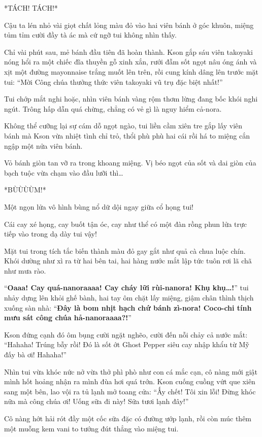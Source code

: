\documentclass[../main.tex]{subfiles}
\begin{document}
*TÁCH! TÁCH!*

Cậu ta lén nhỏ vài giọt chất lỏng màu đỏ vào hai viên bánh ở góc khuôn, miệng tủm tỉm cười đầy tà ác mà cứ ngỡ tui không nhìn thấy.

Chỉ vài phút sau, mẻ bánh đầu tiên đã hoàn thành. Kson gắp sáu viên takoyaki nóng hổi ra một chiếc đĩa thuyền gỗ xinh xắn, rưới đẫm sốt ngọt nâu óng ánh và xịt một đường mayonnaise trắng muốt lên trên, rồi cung kính dâng lên trước mặt tui: ``Mời Công chúa thưởng thức viên takoyaki vũ trụ đặc biệt nhất!''

Tui chớp mắt nghi hoặc, nhìn viên bánh vàng rộm thơm lừng đang bốc khói nghi ngút. Trông hấp dẫn quá chừng, chẳng có vẻ gì là nguy hiểm cả-nora.

Không thể cưỡng lại sự cám dỗ ngọt ngào, tui liền cầm xiên tre gắp lấy viên bánh mà Kson vừa nhiệt tình chỉ trỏ, thổi phù phù hai cái rồi há to miệng cắn ngập một nửa viên bánh.

Vỏ bánh giòn tan vỡ ra trong khoang miệng. Vị béo ngọt của sốt và dai giòn của bạch tuộc vừa chạm vào đầu lưỡi thì\dots

*BÙÙÙÙM!*

Một ngọn lửa vô hình bùng nổ dữ dội ngay giữa cổ họng tui!

Cái cay xé họng, cay buốt tận óc, cay như thể có một đàn rồng phun lửa trực tiếp vào trong dạ dày tui vậy!

Mặt tui trong tích tắc biến thành màu đỏ gay gắt như quả cà chua luộc chín. Khói dường như xì ra từ hai bên tai, hai hàng nước mắt lập tức tuôn rơi lã chã như mưa rào.

``\textbf{Oaaa! Cay quá-nanoraaaa! Cay cháy lữi rùi-nanora! Khụ khụ\dots!}'' tui nhảy dựng lên khỏi ghế bành, hai tay ôm chặt lấy miệng, giậm chân thình thịch xuống sàn nhà: ``\textbf{Đây là bom nhịt hạch chứ bánh zì-nora! Coco-chi tính mưu sát công chúa hả-nanoraaaa?!}''

Kson đứng cạnh đó ôm bụng cười ngặt nghẽo, cười đến nỗi chảy cả nước mắt: ``Hahaha! Trúng bẫy rồi! Đó là sốt ớt Ghost Pepper siêu cay nhập khẩu từ Mỹ đấy bà ơi! Hahaha!''

Nhìn tui vừa khóc nức nở vừa thở phì phò như con cá mắc cạn, cô nàng mới giật mình hốt hoảng nhận ra mình đùa hơi quá trớn. Kson cuống cuồng vứt que xiên sang một bên, lao vội ra tủ lạnh mở toang cửa: ``Ấy chết! Tôi xin lỗi! Đừng khóc nữa mà công chúa ơi! Uống sữa đi này! Sữa tươi lạnh đây!''

Cô nàng hớt hải rót đầy một cốc sữa đặc có đường ướp lạnh, rồi còn múc thêm một muỗng kem vani to tướng đút thẳng vào miệng tui.
\end{document}

